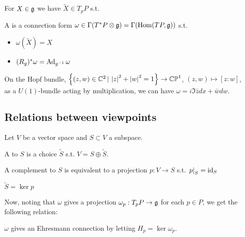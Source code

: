 \documentclass{article}
\begin{document}
\begin{definition}
For $X \in \mathfrak{g}$ we have $\tilde{X}\in T_pP$ s.t. 
\end{definition}

\begin{definition}
A  is a connection form $\omega \in \Gamma(T^\ast P \otimes \mathfrak{g})= \Gamma(\operatorname{Hom}(TP,\mathfrak{g}))$ s.t. 
\begin{itemize}
    \item $\omega(\tilde{X}) = X$
    \item $(R_g)^\ast \omega = \operatorname{Ad}_{g^{-1}}\omega$
\end{itemize}
\end{definition}

\begin{example}
	On the Hopf bundle, $\left\{ (z,w) \in \mathbb{C}^2 \, | \, \left\lvert z \right\rvert^2+\left\lvert w \right\rvert^2=1 \right\} \to \mathbb{CP}^1$, $(z,w) \mapsto [z:w]$, as a $U(1)$-bundle acting by multiplication, we can have $\omega = i \Im \bar{z}dx + \bar{w}dw$.
\end{example}

\subsection{Relations between viewpoints}
Let $V$ be a vector space and $S \subset V$ a subspace. 

\begin{definition}
A  to $S$ is a choice $\tilde{S}$ s.t. $V = S \oplus \tilde{S}$. \end{definition}

\begin{lemma}
A complement to $S$ is equivalent to a projection $p: V \to S$ s.t. $\left. p \right\rvert_{S} = \operatorname{id}_S$
\end{lemma}
\begin{corollary}
$\tilde{S}=\ker p$ 
\end{corollary}

Now, noting that $\omega$ gives a projection $\omega_p : T_pP \to \mathfrak{g}$ for each $p \in P$, we get the following relation:

\begin{prop}
$\omega$ gives an Ehresmann connection by letting $H_p = \ker \omega_p$. 
\end{prop} 
\end{document}
